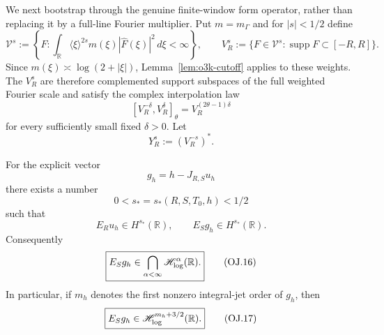 We next bootstrap through the genuine finite-window form operator, rather than replacing
it by a full-line Fourier multiplier.  Put $m=m_\Gamma$ and for $|s|<1/2$ define
\[
 \mathcal V^s
 :=\left\{F:\int_{\mathbb R}
 \langle\xi\rangle^{2s}m(\xi)|\widehat F(\xi)|^2\,d\xi<\infty\right\},
\qquad
 V_R^s:=\{F\in\mathcal V^s:\operatorname{supp}F\subset[-R,R]\}.
\tag{OJ.13}\label{eq:o3k-Vs}
\]
Since $m(\xi)\asymp\log(2+|\xi|)$, Lemma~\ref{lem:o3k-cutoff} applies to these weights.
The $V_R^s$ are therefore complemented support subspaces of the full weighted Fourier
scale and satisfy the complex interpolation law
\[
 [V_R^{-\delta},V_R^{\delta}]_\theta
 =V_R^{(2\theta-1)\delta}
\tag{OJ.14}\label{eq:o3k-interpolation}
\]
for every sufficiently small fixed $\delta>0$.  Let
\[
 Y_R^s:=(V_R^{-s})^*.
\]

\begin{theorem}\label{thm:o3k-complement}
For the explicit vector
\[
 g_h=h-J_{R,S}u_h
\]
there exists a number
\[
 0<s_*=s_*(R,S,T_0,h)<1/2
\]
such that
\[
 \boxed{E_Ru_h\in H^{s_*}(\mathbb R),\qquad
 E_Sg_h\in H^{s_*}(\mathbb R).}
\tag{OJ.15}\label{eq:o3k-positive-sobolev}
\]
Consequently
\[
 \boxed{
 E_Sg_h\in\bigcap_{\alpha<\infty}\mathscr H_{\log}^\alpha(\mathbb R).
 }
\tag{OJ.16}\label{eq:o3k-all-log}
\]
In particular, if $m_h$ denotes the first nonzero integral-jet order of $g_h$, then
\[
 \boxed{E_Sg_h\in\mathscr H_{\log}^{m_h+3/2}(\mathbb R).}
\tag{OJ.17}\label{eq:o3k-log-gate}
\]
\end{theorem}

